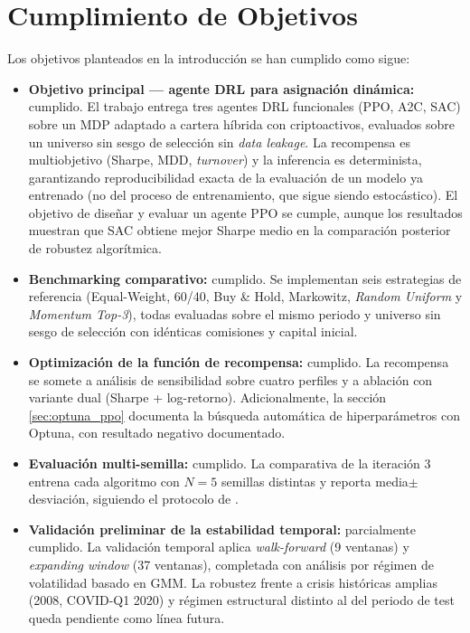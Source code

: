 \documentclass[IB,a4paper]{TFUOC}
\begin{document}
\section{Cumplimiento de Objetivos}
\label{sec:conclusiones_objetivos}

Los objetivos planteados en la introducción se han cumplido como sigue:

\begin{itemize}
    \item \textbf{Objetivo principal — agente DRL para asignación dinámica:} cumplido. El trabajo entrega tres agentes DRL funcionales (PPO, A2C, SAC) sobre un MDP adaptado a cartera híbrida con criptoactivos, evaluados sobre un universo sin sesgo de selección sin \textit{data leakage}. La recompensa es multiobjetivo (Sharpe, MDD, \textit{turnover}) y la inferencia es determinista, garantizando reproducibilidad exacta de la evaluación de un modelo ya entrenado (no del proceso de entrenamiento, que sigue siendo estocástico). El objetivo de diseñar y evaluar un agente PPO se cumple, aunque los resultados muestran que SAC obtiene mejor Sharpe medio en la comparación posterior de robustez algorítmica.
    \item \textbf{Benchmarking comparativo:} cumplido. Se implementan seis estrategias de referencia (Equal-Weight, 60/40, Buy \& Hold, Markowitz, \textit{Random Uniform} y \textit{Momentum Top-3}), todas evaluadas sobre el mismo periodo y universo sin sesgo de selección con idénticas comisiones y capital inicial.
    \item \textbf{Optimización de la función de recompensa:} cumplido. La recompensa se somete a análisis de sensibilidad sobre cuatro perfiles y a ablación con variante dual (Sharpe + log-retorno). Adicionalmente, la sección \ref{sec:optuna_ppo} documenta la búsqueda automática de hiperparámetros con Optuna, con resultado negativo documentado.
    \item \textbf{Evaluación multi-semilla:} cumplido. La comparativa de la iteración 3 entrena cada algoritmo con $N=5$ semillas distintas y reporta media$\pm$desviación, siguiendo el protocolo de \citet{henderson2018deeprl}.
    \item \textbf{Validación preliminar de la estabilidad temporal:} parcialmente cumplido. La validación temporal aplica \textit{walk-forward} (9 ventanas) y \textit{expanding window} (37 ventanas), completada con análisis por régimen de volatilidad basado en GMM. La robustez frente a crisis históricas amplias (2008, COVID-Q1 2020) y régimen estructural distinto al del periodo de test queda pendiente como línea futura.
\end{itemize}
\end{document}
